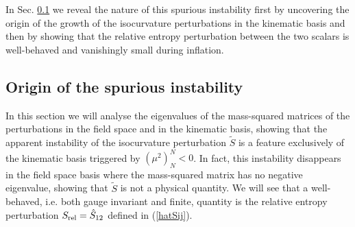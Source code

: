 \documentclass[a4paper,11pt]{article}
\begin{document}
In Sec. \ref{InstabilityOrigin} we reveal the nature of this spurious instability first by uncovering the origin of the growth of the isocurvature perturbations in the kinematic basis and then by showing that the relative entropy perturbation between the two scalars is well-behaved and vanishingly small during inflation.



\subsection{Origin of the spurious instability}
\label{InstabilityOrigin}

In this section we will analyse the eigenvalues of the mass-squared matrices of the perturbations in the field space and in the kinematic basis, showing that the apparent instability of the isocurvature perturbation $\tilde{S}$ is a feature exclusively of the kinematic basis triggered by $(\mu^2)_N^N<0$. In fact, this instability disappears in the field space basis where the mass-squared matrix has no negative eigenvalue, showing that $\tilde{S}$ is not a physical quantity. We will see that a well-behaved, i.e. both gauge invariant and finite, quantity is the relative entropy perturbation $S_{\rm rel} = \hat{S}_{12}$ defined in (\ref{hatSij}).
\end{document}
